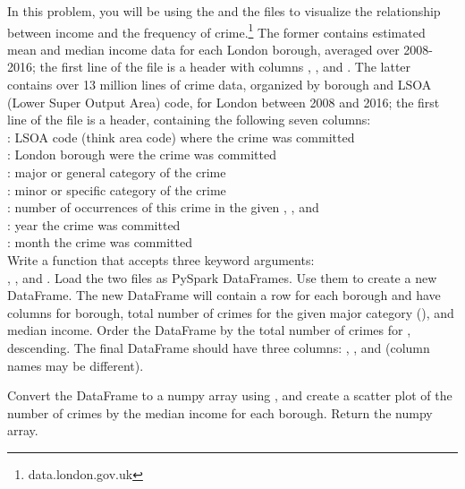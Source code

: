 \begin{problem}
In this problem, you will be using the  and the  files to visualize the relationship between income and the frequency of crime.\footnote{data.london.gov.uk}
The former contains estimated mean and median income data for each London borough, averaged over 2008-2016;
the first line of the file is a header with columns , , and .
The latter contains over 13 million lines of crime data, organized by borough and LSOA (Lower Super Output Area) code, for London between 2008 and 2016;
the first line of the file is a header, containing the following seven columns:\\

: LSOA code (think area code) where the crime was committed\\
\indent{}: London borough were the crime was committed\\
\indent{}: major or general category of the crime\\
\indent{}: minor or specific category of the crime\\
\indent{}: number of occurrences of this crime in the given , , and \\
\indent{}: year the crime was committed\\
\indent{}: month the crime was committed\\

Write a function that accepts three keyword arguments: \\
, , and . Load the two files as PySpark DataFrames. 
Use them to create a new DataFrame. The new DataFrame will contain a row for each borough and have columns for borough, total number of crimes for the given major category (), and median income. 
Order the DataFrame by the total number of crimes for , descending. 
The final DataFrame should have three columns: , , and  (column names may be different).

 
Convert the DataFrame to a numpy array using , and create a scatter plot of the number of  crimes by the median income for each borough. 
Return the numpy array.

\label{prob:spark-df-hard}
\end{problem}


